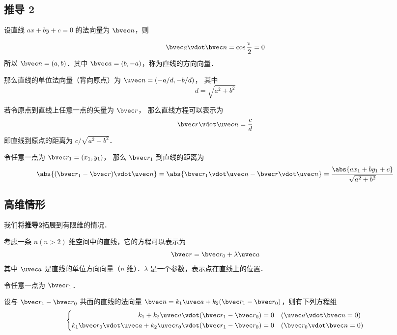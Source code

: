 \subsection{推导 2}

设直线 $ax + by + c = 0$ 的法向量为 $\bvec n$，则

\begin{equation}
\bvec a \vdot \bvec n = \cos \frac{\pi}{2} = 0
\end{equation}
所以 $\bvec n=(a,b)$．其中 $\bvec a=(b,-a)$，称为直线的方向向量．

那么直线的单位法向量（背向原点）为 $\uvec n = (-a/d, -b/d)$， 其中
\begin{equation}
d = \sqrt{a^2 + b^2}
\end{equation}

若令原点到直线上任意一点的矢量为 $\bvec r$， 那么直线方程可以表示为
\begin{equation}
\bvec r \vdot \uvec n = \frac{c}{d}
\end{equation}
即直线到原点的距离为 $c/\sqrt{a^2 + b^2}$．

令任意一点为 $\bvec r_1 = (x_1, y_1)$， 那么 $\bvec r_1$ 到直线的距离为
\begin{equation}
\abs{(\bvec r_1 - \bvec r)\vdot \uvec n} = \abs{\bvec r_1\vdot \uvec n - \bvec r \vdot \uvec n}
= \frac{\abs{ax_1 + by_1 + c}}{\sqrt{a^2 + b^2}}
\end{equation}


 






\subsection{高维情形}


我们将\textbf{推导2}拓展到有限维的情况．

考虑一条 $n(n>2)$ 维空间中的直线，它的方程可以表示为
\begin{equation}
\bvec r = \bvec r_0 + \lambda\uvec a
\end{equation}
其中 $\uvec a$ 是直线的单位方向向量（$n$ 维）．$\lambda$ 是一个参数，表示点在直线上的位置．

令任意一点为 $\bvec r_1$．

设与 $\bvec r_1 - \bvec r_0$ 共面的直线的法向量 $\bvec n=k_1 \uvec a + k_2 (\bvec r_1 - \bvec r_0)$，则有下列方程组
\begin{equation}
\left\lbrace
\begin{aligned}
k_1 + k_2 \uvec a \vdot (\bvec r_1 - \bvec r_0) &= 0 \quad (\uvec a \vdot \bvec n = 0)\\
k_1\bvec r_0\vdot\uvec a + k_2 \uvec r_0\vdot (\bvec r_1 - \bvec r_0) &= 0 \quad (\bvec r_0 \vdot \bvec n = 0)\\
\end{aligned}
\right.
\end{equation}

